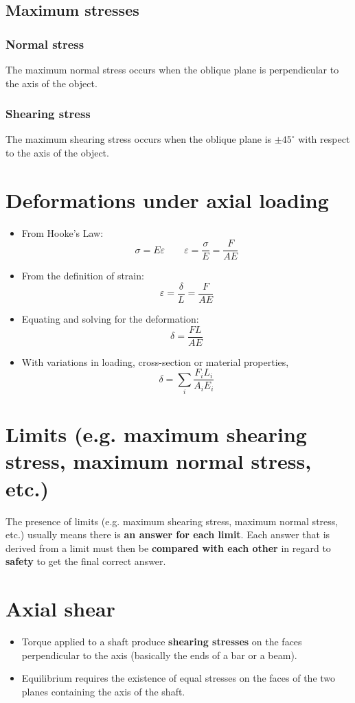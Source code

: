 \documentclass[11pt]{article}
\begin{document}
\subsection{Maximum stresses}
\label{sec:org3e0479c}

\subsubsection{Normal stress}
\label{sec:org3812ee2}
The maximum normal stress occurs when the oblique plane is perpendicular to the axis of the object.
\subsubsection{Shearing stress}
\label{sec:org3ac157d}
The maximum shearing stress occurs when the oblique plane is \(\pm 45^{\circ}\) with respect to the axis of the object.
\section{Deformations under axial loading}
\label{sec:org064ce08}
\begin{itemize}
\item From Hooke's Law:
\[\sigma = E \varepsilon \qquad \varepsilon = \frac{\sigma}{E} = \frac{F}{AE}\]

\item From the definition of strain:
\[\varepsilon = \frac{\delta}{L} = \frac{F}{AE}\]

\item Equating and solving for the deformation:
\[\delta = \frac{FL}{AE}\]

\item With variations in loading, cross-section or material properties,
\[\delta = \sum_i \frac{F_i L_i}{A_i E_i}\]
\end{itemize}
\section{Limits (e.g. maximum shearing stress, maximum normal stress, etc.)}
\label{sec:orgd6a0f10}
The presence of limits (e.g. maximum shearing stress, maximum normal stress, etc.) usually means there is \textbf{an answer for each limit}. Each answer that is derived from a limit must then be \textbf{compared with each other} in regard to \textbf{safety} to get the final correct answer.
\section{Axial shear}
\label{sec:org895e437}
\begin{itemize}
\item Torque applied to a shaft produce \textbf{shearing stresses} on the faces perpendicular to the axis (basically the ends of a bar or a beam).
\item Equilibrium requires the existence of equal stresses on the faces of the two planes containing the axis of the shaft.
\end{itemize}
\end{document}
